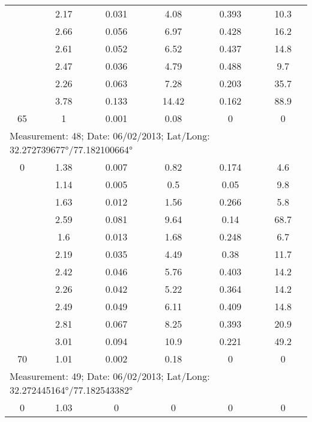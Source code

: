 \begin{longtable}{cccccc}
		& 2.17  & 0.031 & 4.08  & 0.393 & 10.3 \\
		
		& 2.66  & 0.056 & 6.97  & 0.428 & 16.2 \\
		
		& 2.61  & 0.052 & 6.52  & 0.437 & 14.8 \\
		
		& 2.47  & 0.036 & 4.79  & 0.488 & 9.7 \\
		
		& 2.26  & 0.063 & 7.28  & 0.203 & 35.7 \\
		
		& 3.78  & 0.133 & 14.42 & 0.162 & 88.9 \\
		
		65    & 1     & 0.001 & 0.08  & 0     & 0 \\
		\midrule
		\multicolumn{6}{l}{Measurement: 48; Date: 06/02/2013;
			Lat/Long: 32.272739677°/77.182100664°} \\		
		\midrule
		0     & 1.38  & 0.007 & 0.82  & 0.174 & 4.6 \\
		
		& 1.14  & 0.005 & 0.5   & 0.05  & 9.8 \\
		
		& 1.63  & 0.012 & 1.56  & 0.266 & 5.8 \\
		
		& 2.59  & 0.081 & 9.64  & 0.14  & 68.7 \\
		
		& 1.6   & 0.013 & 1.68  & 0.248 & 6.7 \\
		
		& 2.19  & 0.035 & 4.49  & 0.38  & 11.7 \\
		
		& 2.42  & 0.046 & 5.76  & 0.403 & 14.2 \\
		
		& 2.26  & 0.042 & 5.22  & 0.364 & 14.2 \\
		
		& 2.49  & 0.049 & 6.11  & 0.409 & 14.8 \\
		
		& 2.81  & 0.067 & 8.25  & 0.393 & 20.9 \\
		
		& 3.01  & 0.094 & 10.9  & 0.221 & 49.2 \\
		
		70    & 1.01  & 0.002 & 0.18  & 0     & 0 \\
		
		\multicolumn{6}{l}{Measurement: 49; Date: 06/02/2013;
			Lat/Long: 32.272445164°/77.182543382°} \\		
		\midrule
		0     & 1.03  & 0     & 0     & 0     & 0 \\
		

\end{longtable}
